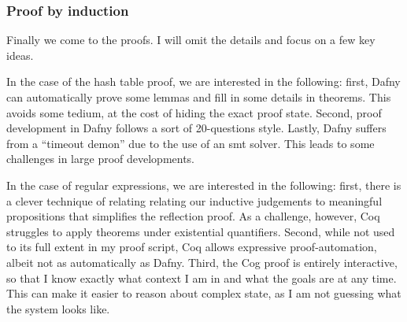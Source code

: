 \subsubsection{Proof by induction}\label{S:ex_ind}

Finally we come to the proofs. I will omit the details and focus on a few key
ideas.

In the case of the hash table proof, we are interested in the following: first,
Dafny can automatically prove some lemmas and fill in some details in theorems.
This avoids some tedium, at the cost of hiding the exact proof state. Second,
proof development in Dafny follows a sort of 20-questions style. Lastly, Dafny
suffers from a ``timeout demon'' due to the use of an \gls{smt} solver. This
leads to some challenges in large proof developments.

In the case of regular expressions, we are interested in the following: first,
there is a clever technique of relating relating our inductive judgements to
meaningful propositions that simplifies the reflection proof. As a challenge,
however, Coq struggles to apply theorems under existential quantifiers. Second,
while not used to its full extent in my proof script, Coq allows expressive
proof-automation, albeit not as automatically as Dafny. Third, the Cog proof is
entirely interactive, so that I know exactly what context I am in and what the
goals are at any time. This can make it easier to reason about complex state, as
I am not guessing what the system looks like.

